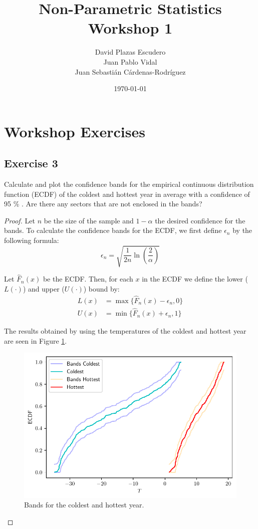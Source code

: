 \documentclass[11pt]{article}
\title{Non-Parametric Statistics Workshop 1}
\author{David Plazas Escudero \\
  Juan Pablo Vidal \\
  Juan Sebasti\'an C\'ardenas-Rodríguez \\
  \scalebox{0.7}{Mathematical Engineering, Universidad EAFIT}}
\date{\today}
\theoremstyle{definition}
\theoremstyle{remark}
\theoremstyle{remark}
\begin{document}
\maketitle
\section{Workshop Exercises}
\subsection*{Exercise 3}
Calculate and plot the confidence bands for the empirical continuous
distribution function (ECDF) of the coldest and hottest year in
average with a confidence of 95 \% . Are there any sectors that are
not enclosed in the bands?

\begin{proof}
  Let $n$ be the size of the sample and $1 - \alpha$ the desired
  confidence for the bands. To calculate the confidence bands for the
  ECDF, we first define $\epsilon_n$ by the following formula:
  \begin{equation*}
    \epsilon_n = \sqrt{\frac{1}{2n} \ln\left(\frac{2}{\alpha}\right)}
  \end{equation*}

  Let $\hat{F}_n(x)$ be the ECDF. Then, for each $x$ in the ECDF we
  define the lower ($L(\cdot)$) and upper ($U(\cdot)$) bound by:
  \begin{align*}
    L(x) &= \max\{\hat{F}_n(x) - \epsilon_n, 0\} \\
    U(x) &= \min\{\hat{F}_n(x) + \epsilon_n, 1\}
  \end{align*}

  The results obtained by using the temperatures of the coldest and
  hottest year are seen in Figure \ref{fig:ex3}.
  \begin{figure}[H]
    \centering
    \includegraphics[scale=0.5]{../figs/ecdf_bands.pdf}
    \caption{Bands for the coldest and hottest year.}
    \label{fig:ex3}
  \end{figure}


\end{proof}
\end{document}
